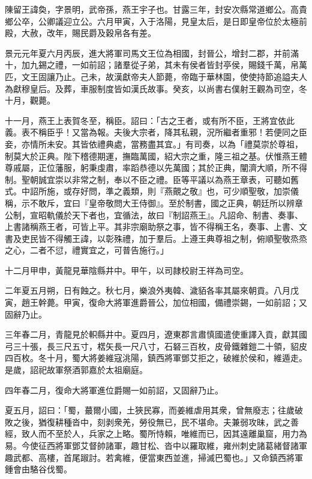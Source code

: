 
\begin{pinyinscope}
陳留王諱奐，字景明，武帝孫，燕王宇子也。甘露三年，封安次縣常道鄉公。高貴鄉公卒，公卿議迎立公。六月甲寅，入于洛陽，見皇太后，是日即皇帝位於太極前殿，大赦，改年，賜民爵及穀帛各有差。

景元元年夏六月丙辰，進大將軍司馬文王位為相國，封晉公，增封二郡，并前滿十，加九錫之禮，一如前詔；諸羣從子弟，其未有侯者皆封亭侯，賜錢千萬，帛萬匹，文王固讓乃止。己未，故漢獻帝夫人節薨，帝臨于華林園，使使持節追謚夫人為獻穆皇后。及葬，車服制度皆如漢氏故事。癸亥，以尚書右僕射王觀為司空，冬十月，觀薨。

十一月，燕王上表賀冬至，稱臣。詔曰：「古之王者，或有所不臣，王將宜依此義。表不稱臣乎！又當為報。夫後大宗者，降其私親，況所繼者重邪！若便同之臣妾，亦情所未安。其皆依禮典處，當務盡其宜。」有司奏，以為「禮莫崇於尊祖，制莫大於正典。陛下稽德期運，撫臨萬國，紹大宗之重，隆三祖之基。伏惟燕王體尊戚屬，正位藩服，躬秉虔肅，率蹈恭德以先萬國；其於正典，闡濟大順，所不得制。聖朝誠宜崇以非常之制，奉以不臣之禮。臣等平議以為燕王章表，可聽如舊式。中詔所施，或存好問，準之義類，則『燕覿之敬』也，可少順聖敬，加崇儀稱，示不敢斥，宜曰『皇帝敬問大王侍御』。至於制書，國之正典，朝廷所以辨章公制，宣昭軌儀於天下者也，宜循法，故曰『制詔燕王』。凡詔命、制書、奏事、上書諸稱燕王者，可皆上平。其非宗廟助祭之事，皆不得稱王名，奏事、上書、文書及吏民皆不得觸王諱，以彰殊禮，加于羣后。上遵王典尊祖之制，俯順聖敬烝烝之心，二者不愆，禮實宜之，可普告施行。」

十二月甲申，黃龍見華陰縣井中。甲午，以司隷校尉王祥為司空。

二年夏五月朔，日有蝕之。秋七月，樂浪外夷韓、濊貊各率其屬來朝貢。八月戊寅，趙王幹薨。甲寅，復命大將軍進爵晉公，加位相國，備禮崇錫，一如前詔；又固辭乃止。

三年春二月，青龍見於軹縣井中。夏四月，遼東郡言肅慎國遣使重譯入貢，獻其國弓三十張，長三尺五寸，楛矢長一尺八寸，石砮三百枚，皮骨鐵雜鎧二十領，貂皮四百枚。冬十月，蜀大將姜維寇洮陽，鎮西將軍鄧艾拒之，破維於侯和，維遁走。是歲，詔祀故軍祭酒郭嘉於太祖廟庭。

四年春二月，復命大將軍進位爵賜一如前詔，又固辭乃止。

夏五月，詔曰：「蜀，蕞爾小國，土狹民寡，而姜維虐用其衆，曾無廢志；往歲破敗之後，猶復耕種沓中，刻剥衆羌，勞役無已，民不堪命。夫兼弱攻昧，武之善經，致人而不至於人，兵家之上略。蜀所恃賴，唯維而已，因其遠離巢窟，用力為易。今使征西將軍鄧艾督帥諸軍，趣甘松、沓中以羅取維，雍州刺史諸葛緒督諸軍趣武都、高樓，首尾踧討。若禽維，便當東西並進，掃滅巴蜀也。」又命鎮西將軍鍾會由駱谷伐蜀。


\end{pinyinscope}
